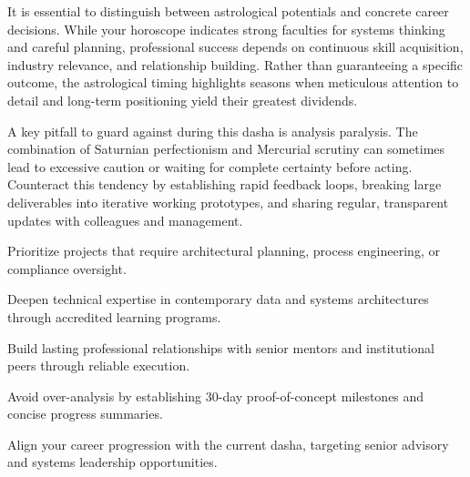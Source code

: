 {\fontsize{9}{13}\selectfont It is essential to distinguish between astrological potentials and concrete career decisions. While your horoscope indicates strong faculties for systems thinking and careful planning, professional success depends on continuous skill acquisition, industry relevance, and relationship building. Rather than guaranteeing a specific outcome, the astrological timing highlights seasons when meticulous attention to detail and long-term positioning yield their greatest dividends.}\par\vspace{1.8mm}

{\fontsize{9}{13}\selectfont A key pitfall to guard against during this dasha is analysis paralysis. The combination of Saturnian perfectionism and Mercurial scrutiny can sometimes lead to excessive caution or waiting for complete certainty before acting. Counteract this tendency by establishing rapid feedback loops, breaking large deliverables into iterative working prototypes, and sharing regular, transparent updates with colleagues and management.}\par\vspace{1.8mm}

\begin{diamondlist}
  \item {\fontsize{8.5}{12}\selectfont Prioritize projects that require architectural planning, process engineering, or compliance oversight.}
  \item {\fontsize{8.5}{12}\selectfont Deepen technical expertise in contemporary data and systems architectures through accredited learning programs.}
  \item {\fontsize{8.5}{12}\selectfont Build lasting professional relationships with senior mentors and institutional peers through reliable execution.}
  \item {\fontsize{8.5}{12}\selectfont Avoid over-analysis by establishing 30-day proof-of-concept milestones and concise progress summaries.}
  \item {\fontsize{8.5}{12}\selectfont Align your career progression with the current dasha, targeting senior advisory and systems leadership opportunities.}
\end{diamondlist}


\label{topic67}

